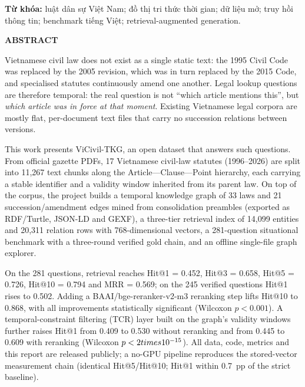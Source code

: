 \documentclass[12pt,a4paper]{report}
\renewcommand{\_}{\textunderscore\allowbreak}
\begin{document}
\vspace{0.3cm}
\noindent\textbf{Từ khóa:} luật dân sự Việt Nam; đồ thị tri thức thời gian; dữ liệu mở; truy hồi thông tin; benchmark tiếng Việt; retrieval-augmented generation.

\vspace{0.5cm}
\begin{center}
{\large\bfseries\color{ink} ABSTRACT\par}
\end{center}
\vspace{0.2cm}

\begin{english}
Vietnamese civil law does not exist as a single static text: the 1995 Civil Code was replaced by the 2005 revision, which was in turn replaced by the 2015 Code, and specialised statutes continuously amend one another. Legal lookup questions are therefore temporal: the real question is not ``which article mentions this'', but \emph{which article was in force at that moment}. Existing Vietnamese legal corpora are mostly flat, per-document text files that carry no succession relations between versions.

This work presents ViCivil-TKG, an open dataset that answers such questions. From official gazette PDFs, 17 Vietnamese civil-law statutes (1996--2026) are split into 11,267 text chunks along the Article---Clause---Point hierarchy, each carrying a stable identifier and a validity window inherited from its parent law. On top of the corpus, the project builds a temporal knowledge graph of 33 laws and 21 succession/amendment edges mined from consolidation preambles (exported as RDF/Turtle, JSON-LD and GEXF), a three-tier retrieval index of 14,099 entities and 20,311 relation rows with 768-dimensional vectors, a 281-question situational benchmark with a three-round verified gold chain, and an offline single-file graph explorer.

On the 281 questions, retrieval reaches Hit@1 = 0.452, Hit@3 = 0.658, Hit@5 = 0.726, Hit@10 = 0.794 and MRR = 0.569; on the 245 verified questions Hit@1 rises to 0.502. Adding a BAAI/bge-reranker-v2-m3 reranking step lifts Hit@10 to 0.868, with all improvements statistically significant (Wilcoxon $p<0.001$). A temporal-constraint filtering (TCR) layer built on the graph's validity windows further raises Hit@1 from 0.409 to 0.530 without reranking and from 0.445 to 0.609 with reranking (Wilcoxon $p<2\\times10^{-15}$). All data, code, metrics and this report are released publicly; a no-GPU pipeline reproduces the stored-vector measurement chain (identical Hit@5/Hit@10; Hit@1 within 0.7~pp of the strict baseline).
\end{english}
\end{document}
